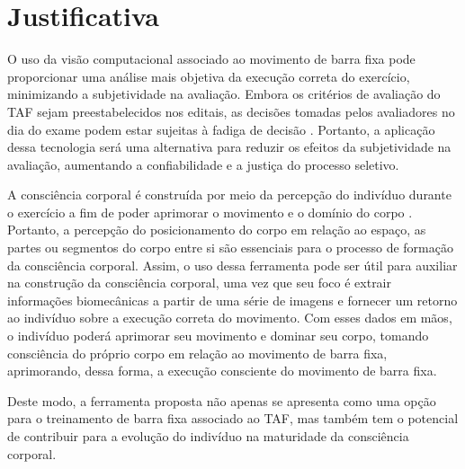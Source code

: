 \section{Justificativa}

O uso da visão computacional associado ao movimento de barra fixa pode proporcionar uma análise mais objetiva da execução correta do exercício, minimizando a subjetividade na avaliação. Embora os critérios de avaliação do \ac{TAF} sejam preestabelecidos nos editais, as decisões tomadas pelos avaliadores no dia do exame podem estar sujeitas à fadiga de decisão \cite{fadiga}. Portanto, a aplicação dessa tecnologia será uma alternativa para reduzir os efeitos da subjetividade na avaliação, aumentando a confiabilidade e a justiça do processo seletivo.

A consciência corporal é construída por meio da percepção do indivíduo durante o exercício a fim de poder aprimorar o movimento e o domínio do corpo \cite{consciencia}. Portanto, a percepção do posicionamento do corpo em relação ao espaço, as partes ou segmentos do corpo entre si são essenciais para o processo de formação da consciência corporal. Assim, o uso dessa ferramenta pode ser útil para auxiliar na construção da consciência corporal, uma vez que seu foco é extrair informações biomecânicas a partir de uma série de imagens e fornecer um retorno ao indivíduo sobre a execução correta do movimento. Com esses dados em mãos, o indivíduo poderá aprimorar seu movimento e dominar seu corpo, tomando consciência do próprio corpo em relação ao movimento de barra fixa, aprimorando, dessa forma, a execução consciente do movimento de barra fixa.

Deste modo, a ferramenta proposta não apenas se apresenta como uma opção para o treinamento de barra fixa associado ao \ac{TAF}, mas também tem o potencial de contribuir para a evolução do indivíduo na maturidade da consciência corporal.
